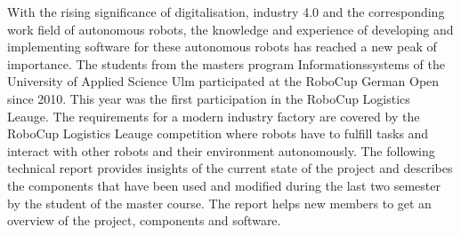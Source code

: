 With the rising significance of digitalisation, industry 4.0 and the corresponding work field of autonomous robots, the knowledge and experience of developing and implementing software for these autonomous robots has reached a new peak of importance. The students from the masters program Informationssystems of the University of Applied Science Ulm participated at the RoboCup German Open since 2010. This year was the first participation in the RoboCup Logistics Leauge. The requirements for a modern industry factory are covered by the RoboCup Logistics Leauge competition where robots have to fulfill tasks and interact with other robots and their environment autonomously. The following technical report provides insights of the current state of the project and describes the components that have been used and modified during the last two semester by the student of the master course. The report helps new members to get an overview of the project, components and software.